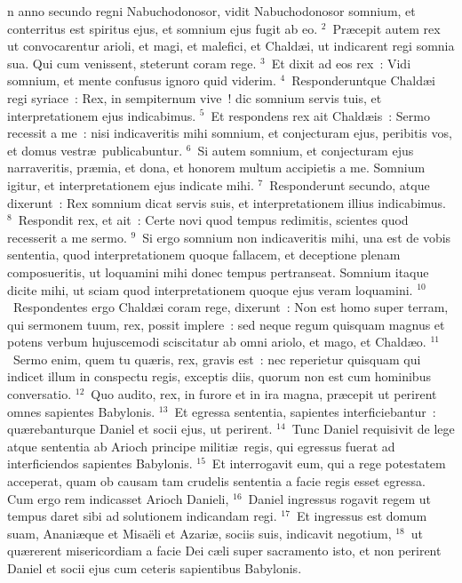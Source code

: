 \bchapter
{}n anno secundo regni Nabuchodonosor, vidit Nabuchodonosor somnium, et conterritus est spiritus ejus, et somnium ejus fugit ab eo.
${}^{2}$~Pr\ae cepit autem rex ut convocarentur arioli, et magi, et malefici, et Chald\ae i, ut indicarent regi somnia sua. Qui cum venissent, steterunt coram rege.
${}^{3}$~Et dixit ad eos rex~: Vidi somnium, et mente confusus ignoro quid viderim.
${}^{4}$~Responderuntque Chald\ae i regi syriace~: Rex, in sempiternum vive~! dic somnium servis tuis, et interpretationem ejus indicabimus.
${}^{5}$~Et respondens rex ait Chald\ae is~: Sermo recessit a me~: nisi indicaveritis mihi somnium, et conjecturam ejus, peribitis vos, et domus vestr\ae\ publicabuntur.
${}^{6}$~Si autem somnium, et conjecturam ejus narraveritis, pr\ae mia, et dona, et honorem multum accipietis a me. Somnium igitur, et interpretationem ejus indicate mihi.
${}^{7}$~Responderunt secundo, atque dixerunt~: Rex somnium dicat servis suis, et interpretationem illius indicabimus.
${}^{8}$~Respondit rex, et ait~: Certe novi quod tempus redimitis, scientes quod recesserit a me sermo.
${}^{9}$~Si ergo somnium non indicaveritis mihi, una est de vobis sententia, quod interpretationem quoque fallacem, et deceptione plenam composueritis, ut loquamini mihi donec tempus pertranseat. Somnium itaque dicite mihi, ut sciam quod interpretationem quoque ejus veram loquamini.
${}^{10}$~Respondentes ergo Chald\ae i coram rege, dixerunt~: Non est homo super terram, qui sermonem tuum, rex, possit implere~: sed neque regum quisquam magnus et potens verbum hujuscemodi sciscitatur ab omni ariolo, et mago, et Chald\ae o.
${}^{11}$~Sermo enim, quem tu qu\ae ris, rex, gravis est~: nec reperietur quisquam qui indicet illum in conspectu regis, exceptis diis, quorum non est cum hominibus conversatio.
${}^{12}$~Quo audito, rex, in furore et in ira magna, pr\ae cepit ut perirent omnes sapientes Babylonis.
${}^{13}$~Et egressa sententia, sapientes interficiebantur~: qu\ae rebanturque Daniel et socii ejus, ut perirent.
${}^{14}$~Tunc Daniel requisivit de lege atque sententia ab Arioch principe militi\ae\ regis, qui egressus fuerat ad interficiendos sapientes Babylonis.
${}^{15}$~Et interrogavit eum, qui a rege potestatem acceperat, quam ob causam tam crudelis sententia a facie regis esset egressa. Cum ergo rem indicasset Arioch Danieli,
${}^{16}$~Daniel ingressus rogavit regem ut tempus daret sibi ad solutionem indicandam regi.
${}^{17}$~Et ingressus est domum suam, Anani\ae que et Misa\"eli et Azari\ae , sociis suis, indicavit negotium,
${}^{18}$~ut qu\ae rerent misericordiam a facie Dei c\ae li super sacramento isto, et non perirent Daniel et socii ejus cum ceteris sapientibus Babylonis.


